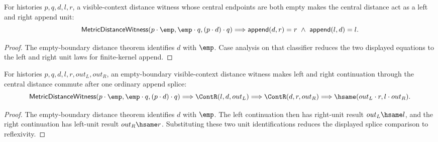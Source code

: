 \begin{theorem}
\label{thm:metric-distance-witness-empty-boundary-visible-context-append-unit-laws}
For histories $p,q,d,l,r$, a visible-context distance witness whose central
endpoints are both empty makes the central distance act as a left and right
append unit:
$$
\mathsf{MetricDistanceWitness}(p\cdot\emp,\emp\cdot q,(p\cdot d)\cdot q)
\Longrightarrow
\mathsf{append}(d,r)=r\ \wedge\ \mathsf{append}(l,d)=l.
$$
\end{theorem}
\begin{proof}
The empty-boundary distance theorem identifies $d$ with $\emp$. Case analysis
on that classifier reduces the two displayed equations to the left and right
unit laws for finite-kernel append.
\end{proof}

\begin{theorem}
\label{thm:metric-distance-witness-empty-boundary-visible-context-unit-splice-commute}
For histories $p,q,d,l,r,out_L,out_R$, an empty-boundary visible-context
distance witness makes left and right continuation through the central distance
commute after one ordinary append splice:
$$
\mathsf{MetricDistanceWitness}(p\cdot\emp,\emp\cdot q,(p\cdot d)\cdot q)
\Longrightarrow
\ContR(l,d,out_L)\Longrightarrow
\ContR(d,r,out_R)\Longrightarrow
\hsame(out_L\cdot r,l\cdot out_R).
$$
\end{theorem}
\begin{proof}
The empty-boundary distance theorem identifies $d$ with $\emp$. The left
continuation then has right-unit result $out_L\hsame l$, and the right
continuation has left-unit result $out_R\hsame r$. Substituting these two unit
identifications reduces the displayed splice comparison to reflexivity.
\end{proof}

